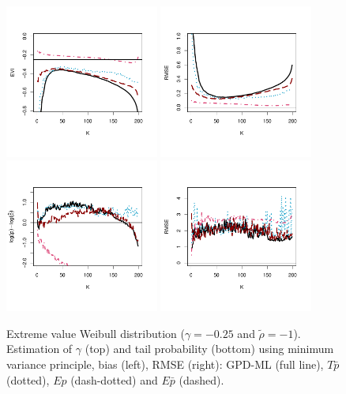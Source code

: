 \begin{figure}[!ht]
 \centering
\includegraphics[width=0.45\textwidth]{./plots/paper3/weibullGPD_evi.pdf} 
\includegraphics[width=0.45\textwidth]{./plots/paper3/weibullGPD_rmse.pdf} \\
\includegraphics[width=0.45\textwidth]{./plots/paper3/weibullGPD_tail.pdf}
\includegraphics[width=0.45\textwidth]{./plots/paper3/weibullGPD_tail_rmse.pdf} 
 \caption{Extreme value Weibull distribution ($\gamma=-0.25$ and $\tilde\rho=-1$). Estimation of $\gamma$ (top) and tail probability (bottom) using minimum variance principle, bias (left), RMSE (right): GPD-ML (full line), $T\bar{p}$ (dotted), $Ep$ (dash-dotted) and $E\bar{p}$ (dashed).}
\label{paper3:fig9}
\end{figure}

